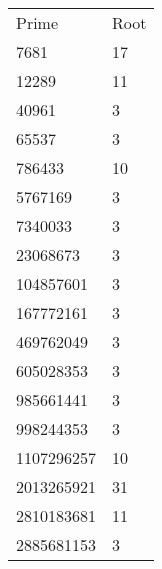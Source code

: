 \normalsize
\begin{tabular}{ l l }
Prime & Root \\
7681 & 17 \\
12289 & 11 \\
40961 & 3 \\
65537 & 3 \\
786433 & 10 \\
5767169 & 3 \\
7340033 & 3 \\
23068673 & 3 \\
104857601 & 3 \\
167772161 & 3 \\
469762049 & 3 \\
605028353 & 3 \\
985661441 & 3 \\
998244353 & 3 \\   
1107296257 & 10 \\
2013265921 & 31 \\
2810183681 & 11 \\
2885681153 & 3
\end{tabular}
